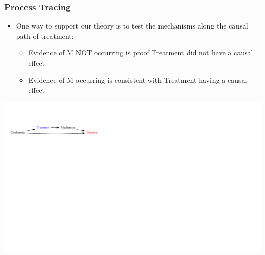 \documentclass[xcolor=x11names,compress]{beamer}\usepackage[]{graphicx}\usepackage[]{color}
\newenvironment{knitrout}{}{} %
\renewcommand{\(}{\begin{columns}}
\renewcommand{\)}{\end{columns}}
\newcommand{\<}[1]{\begin{column}{#1}}
\renewcommand{\>}{\end{column}}
\begin{document}
\begin{frame}
\frametitle{Process Tracing}
\begin{itemize}
\item One way to support our theory is to test the mechanisms along the causal path of treatment:
\begin{itemize}
\item Evidence of M NOT occurring is proof Treatment did not have a causal effect
\item Evidence of M occurring is consistent with Treatment having a causal effect
\end{itemize}
\end{itemize}
\begin{knitrout}
\color{fgcolor}
\includegraphics[width=1.8\linewidth]{figure/Dag2-1} 

\end{knitrout}
\end{frame}
\end{document}
